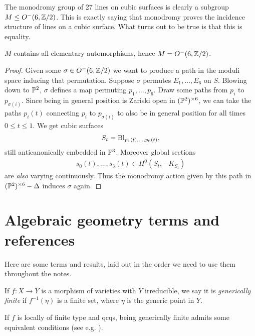 \documentclass[11pt]{amsart}
\begin{document}
The monodromy group of 27 lines on cubic surfaces is clearly a subgroup $M \le O^-(6,\Z/2)$. This is exactly saying that monodromy proves the incidence structure of lines on a cubic surface. What turns out to be true is that this is equality.

\begin{theorem} $M$ contains all elementary automorphisms, hence $M = O^-(6,\Z/2)$.
\end{theorem}
\begin{proof} Given some $\sigma \in O^-(6,\Z/2)$ we want to produce a path in the moduli space inducing that permutation. Suppose $\sigma$ permutes $E_1, \ldots, E_6$ on $S$. Blowing down to $\P^2$, $\sigma$ defines a map permuting $p_1, \ldots, p_6$. Draw some paths from $p_i$ to $p_{\sigma(i)}$. Since being in general position is Zariski open in $(\P^2)^{\times6}$, we can take the paths $p_i(t)$ connecting $p_i$ to $p_{\sigma(i)}$ to also be in general position for all times $0\le t \le 1$. We get cubic surfaces
\begin{align*}
    S_t = \Bl_{p_1(t), \ldots, p_6(t)},
\end{align*}
still anticanonically embedded in $\P^3$. Moreover global sections 
\begin{align*}
    s_0(t), \ldots, s_3(t) \in H^0(S_t, -K_{S_t})
\end{align*}
are \textit{also} varying continuously. Thus the monodromy action given by this path in $(\P^2)^{\times6}-\Delta$ induces $\sigma$ again.
\end{proof}




\appendix

\section{Algebraic geometry terms and references}

Here are some terms and results, laid out in the order we need to use them throughout the notes.

\begin{definition}
\label{def:generically-finite}
If $f \colon X \to Y$ is a morphism of varieties with $Y$ irreducible, we say it is \textit{generically finite} if $f^{-1}(\eta)$ is a finite set, where $\eta$ is the generic point in $Y$.
\end{definition}

\begin{remark} If $f$ is locally of finite type and qcqs, being generically finite admits some equivalent conditions (see e.g. \cite[02NW]{Stacks}).
\end{remark}
\end{document}
